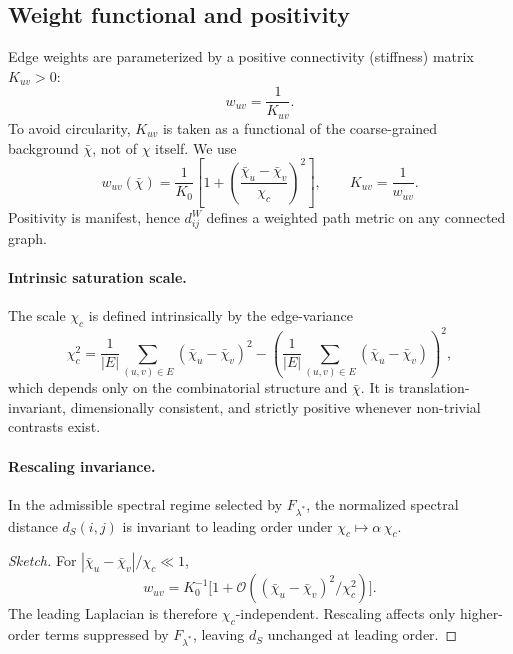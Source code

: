 \subsection{Weight functional and positivity}
  \label{subsec:weight-functional-and-positivity}

  Edge weights are parameterized by a positive connectivity (stiffness)
  matrix $K_{uv}>0$:
  \[
    w_{uv} = \frac{1}{K_{uv}}.
  \]
  To avoid circularity, $K_{uv}$ is taken as a functional of the
  coarse-grained background $\bar{\chi}$, not of $\chi$ itself. We use
  \begin{equation}
    w_{uv}(\bar{\chi})
    =
    \frac{1}{K_0}
    \left[
      1 + \left(\frac{\bar{\chi}_u-\bar{\chi}_v}{\chi_c}\right)^2
    \right],
    \qquad
    K_{uv} = \frac{1}{w_{uv}}.
    \label{eq:weights}
  \end{equation}
  Positivity is manifest, hence $d_{ij}^{W}$ defines a weighted
  path metric on any connected graph.

  \paragraph{Intrinsic saturation scale.}
    The scale $\chi_c$ is defined intrinsically by the edge-variance
    \begin{equation}
      \chi_c^2
      =
      \frac{1}{|E|}\sum_{(u,v)\in E}(\bar{\chi}_u - \bar{\chi}_v)^2
      -
      \left(\frac{1}{|E|}\sum_{(u,v)\in E}(\bar{\chi}_u - \bar{\chi}_v)\right)^2,
      \label{eq:chi_c_intrinsic}
    \end{equation}
    which depends only on the combinatorial structure and $\bar{\chi}$.
    It is translation-invariant, dimensionally consistent, and strictly
    positive whenever non-trivial contrasts exist.

  \paragraph{Rescaling invariance.}
    \begin{lemma}
      In the admissible spectral regime selected by $F_{\lambda^*}$,
      the normalized spectral distance $d_S(i,j)$ is invariant to leading
      order under $\chi_c \mapsto \alpha\,\chi_c$.
    \end{lemma}

    \begin{proof}[Sketch]
For $|\bar{\chi}_u-\bar{\chi}_v|/\chi_c \ll 1$,
\[
  w_{uv}
  =
  K_0^{-1}
  \Big[1 + \mathcal{O}((\bar{\chi}_u-\bar{\chi}_v)^2/\chi_c^2)\Big].
\]
The leading Laplacian is therefore $\chi_c$-independent.
Rescaling affects only higher-order terms suppressed by
$F_{\lambda^*}$, leaving $d_S$ unchanged at leading order.
    \end{proof}
